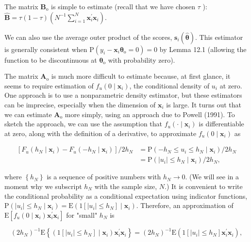 \documentclass[10pt]{article}
\begin{document}
The matrix $\mathbf{B}_{\mathrm{o}}$ is simple to estimate (recall that we have chosen $\tau$ ):\\
$\hat{\mathbf{B}}=\tau(1-\tau)\left(N^{-1} \sum_{i=1}^{N} \mathbf{x}_{i}^{\prime} \mathbf{x}_{i}\right)$.

We can also use the average outer product of the scores, $\mathbf{s}_{i}(\hat{\boldsymbol{\theta}})$. This estimator is generally consistent when $\mathrm{P}\left(y_{i}-\mathbf{x}_{i} \boldsymbol{\theta}_{\mathrm{o}}=0\right)=0$ by Lemma 12.1 (allowing the function to be discontinuous at $\boldsymbol{\theta}_{\mathrm{o}}$ with probability zero).

The matrix $\mathbf{A}_{\mathrm{o}}$ is much more difficult to estimate because, at first glance, it seems to require estimation of $f_{u}\left(0 \mid \mathbf{x}_{i}\right)$, the conditional density of $u_{i}$ at zero. One approach is to use a nonparametric density estimator, but these estimators can be imprecise, especially when the dimension of $\mathbf{x}_{i}$ is large. It turns out that we can estimate $\mathbf{A}_{\mathrm{o}}$ more simply, using an approach due to Powell (1991). To sketch the approach, we can use the assumption that $f_{u}\left(\cdot \mid \mathbf{x}_{i}\right)$ is differentiable at zero, along with the definition of a derivative, to approximate $f_{u}\left(0 \mid \mathbf{x}_{i}\right)$ as

$$
\begin{aligned}
{\left[F_{u}\left(h_{N} \mid \mathbf{x}_{i}\right)-F_{u}\left(-h_{N} \mid \mathbf{x}_{i}\right)\right] / 2 h_{N} } & =\mathrm{P}\left(-h_{N} \leq u_{i} \leq h_{N} \mid \mathbf{x}_{i}\right) / 2 h_{N} \\
& =\mathrm{P}\left(\left|u_{i}\right| \leq h_{N} \mid \mathbf{x}_{i}\right) / 2 h_{N},
\end{aligned}
$$

where $\left\{h_{N}\right\}$ is a sequence of positive numbers with $h_{N} \rightarrow 0$. (We will see in a moment why we subscript $h_{N}$ with the sample size, $N$.) It is convenient to write the conditional probability as a conditional expectation using indicator functions, $\mathrm{P}\left(\left|u_{i}\right| \leq h_{N} \mid \mathbf{x}_{i}\right)= \mathrm{E}\left(1\left[\left|u_{i}\right| \leq h_{N}\right] \mid \mathbf{x}_{i}\right)$. Therefore, an approximation of $\mathrm{E}\left[f_{u}\left(0 \mid \mathbf{x}_{i}\right) \mathbf{x}_{i}^{\prime} \mathbf{x}_{i}\right]$ for "small" $h_{N}$ is


\begin{equation*}
\left(2 h_{N}\right)^{-1} \mathrm{E}\left\{\left(1\left[\left|u_{i}\right| \leq h_{N}\right] \mid \mathbf{x}_{i}\right) \mathbf{x}_{i}^{\prime} \mathbf{x}_{i}\right\}=\left(2 h_{N}\right)^{-1} \mathrm{E}\left(1\left[\left|u_{i}\right| \leq h_{N}\right] \mathbf{x}_{i}^{\prime} \mathbf{x}_{i}\right), \tag{12.117}
\end{equation*}
\end{document}
